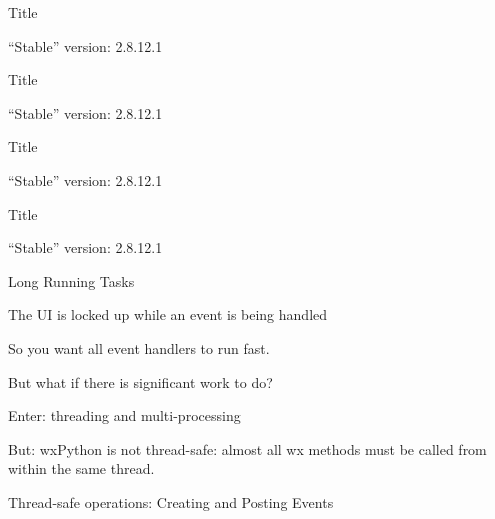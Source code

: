 \documentclass{beamer}
\begin{document}
\begin{frame}[fragile]{Title}

\vfill
{\Large ``Stable'' version: 2.8.12.1}\\

\end{frame}

\begin{frame}[fragile]{Title}

\vfill
{\Large ``Stable'' version: 2.8.12.1}\\

\end{frame}

\begin{frame}[fragile]{Title}

\vfill
{\Large ``Stable'' version: 2.8.12.1}\\

\end{frame}

\begin{frame}[fragile]{Title}

\vfill
{\Large ``Stable'' version: 2.8.12.1}\\

\end{frame}

\begin{frame}[fragile]{Long Running Tasks}

\vfill
{\Large The UI is locked up while an event is being handled}

\vfill
{\Large So you want all event handlers to run fast.}

\vfill
{\Large But what if there is significant work to do?}

\vfill
{\Large Enter: threading and multi-processing}

\vfill
{\Large But: wxPython is not thread-safe: almost all wx methods must be called from within the same thread.}

\vfill
{\Large Thread-safe operations: Creating and Posting Events}


\end{frame}
\end{document}
